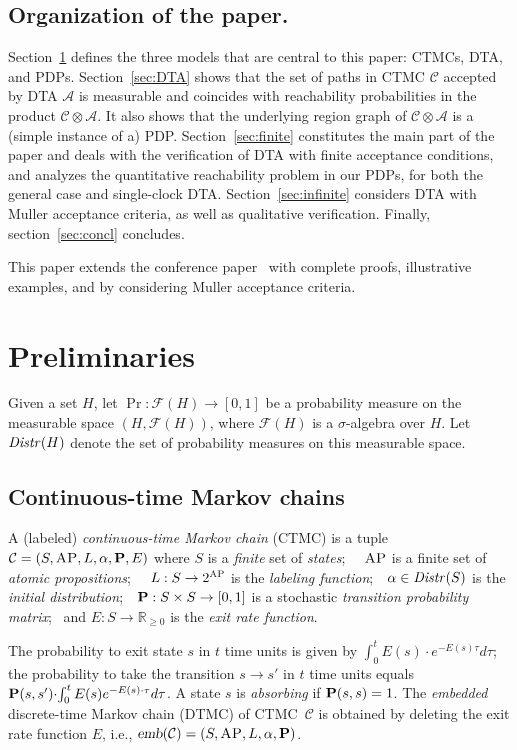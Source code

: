\documentclass{LMCS}
\newcommand{\mc}[1]{\mathcal{#1}}
\newcommand{\<}{\langle}
\renewcommand{\>}{\rangle}
\newcommand{\ges}{\geqslant}
\newcommand{\CTMC}{\textsc{{CTMC}}}
\newcommand{\DTMC}{\textsc{DTMC}}
\newcommand{\emb}{\textsl{emb}}
\renewcommand{\P}{{\bf P}}
\newcommand{\AP}{\textsc{AP}}
\newcommand{\Distr}{{\it Distr}}
\newcommand{\Reals}{\mathbb{R}}
\begin{document}
\subsection*{Organization of the paper.}
Section~\ref{sec:prelim} defines the three models that are central to this paper: CTMCs,
DTA, and PDPs.
Section~\ref{sec:DTA} shows that the set of paths in CTMC $\mc{C}$ accepted by DTA
$\mc{A}$ is measurable and coincides with reachability probabilities in the product
$\mc{C} \otimes \mc{A}$.
It also shows that the underlying region graph of $\mc{C} \otimes \mc{A}$ is a (simple
instance of a) PDP.
Section~\ref{sec:finite} constitutes the main part of the paper and deals with the verification
of DTA with finite acceptance conditions, and analyzes the quantitative reachability problem
in our PDPs, for both the general case and single-clock DTA.
Section~\ref{sec:infinite} considers DTA with Muller acceptance criteria, as well as qualitative
verification.
Finally, section~\ref{sec:concl} concludes.

This paper extends the conference paper~\cite{CHKM09_LICS} with complete proofs,
illustrative examples, and by considering Muller acceptance criteria.

\section{Preliminaries}\label{sec:prelim}

Given a set $H$, let $\Pr:\mc{F}(H)\to[0,1]$ be a probabi\-li\-ty
measure on the measurable space $(H,\mc{F}(H))$, where $\mc{F}(H)$
is a $\sigma$-algebra over $H$. Let $\Distr(H)$ denote the set of
probability measures on this measurable space.

\subsection{Continuous-time Markov chains}
\begin{defi}[\CTMC] A (labeled) \emph{continuous-time Markov chain} (\CTMC) is a
tuple $\mc{C}=(S,\AP,L,\alpha,\P,E)$ where $S$ is a \emph{finite}
set of \emph{states}; \ \ $\AP$ is a finite set of \emph{atomic
propositions}; \ \ $L:S\to 2^{\AP}$ is the \emph{labeling
function};\ \ $\alpha\in \Distr(S)$ is the \emph{initial
distribution};\ \ $\P:S\times S\to [0,1]$ is a stochastic
\emph{transition probability matrix}; \ and $E:S\to \Reals_{\ges
0}$ is the \emph{exit rate function}.
\end{defi}
The probability to exit state $s$ in $t$ time units is given by $\int_{0}^{t}
E(s){\cdot} e^{-E(s)\tau} d\tau$; the probability to take the transition
$s\to s'$ in $t$ time units equals $\P(s,s'){\cdot}\! \int_{0}^{t}E(s)
e^{-E(s){\cdot}\tau} d\tau$.
A state $s$ is \emph{absorbing} if ${\P(s,s)=1}$.
The \emph{embedded} discrete-time Markov chain (\DTMC) of \CTMC\
$\mc{C}$ is obtained by deleting the exit rate function $E$, i.e.,
$\emb(\mc{C})=(S,\AP,L,\alpha,\P)$.
\end{document}
